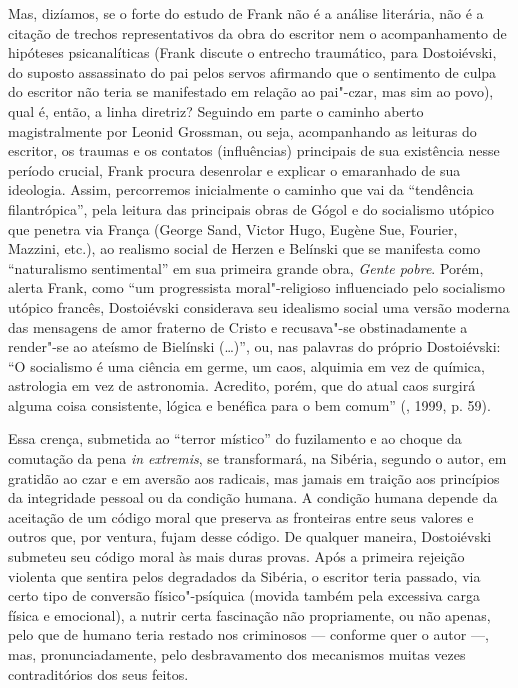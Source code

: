 Mas, dizíamos, se o forte do estudo de Frank não é a análise literária,
não é a citação de trechos representativos da obra do escritor nem o
acompanhamento de hipóteses psicanalíticas (Frank discute o entrecho
traumático, para Dostoiévski, do suposto assassinato do pai pelos servos
afirmando que o sentimento de culpa do escritor não teria se manifestado
em relação ao pai"-czar, mas sim ao povo), qual é, então, a linha
diretriz? Seguindo em parte o caminho aberto magistralmente por Leonid
Grossman, ou seja, acompanhando as leituras do escritor, os traumas e os
contatos (influências) principais de sua existência nesse período
crucial, Frank procura desenrolar e explicar o emaranhado de sua
ideologia. Assim, percorremos inicialmente o caminho que vai da
``tendência filantrópica'', pela leitura das principais obras de Gógol e
do socialismo utópico que penetra via França (George Sand, Victor Hugo,
Eugène Sue, Fourier, Mazzini, etc.), ao realismo social de Herzen e
Belínski que se manifesta como ``naturalismo sentimental'' em sua
primeira grande obra, \emph{Gente pobre}. Porém, alerta Frank, como ``um
progressista moral"-religioso influenciado pelo socialismo utópico
francês, Dostoiévski considerava seu idealismo social uma versão moderna
das mensagens de amor fraterno de Cristo e recusava"-se obstinadamente a
render"-se ao ateísmo de Bielínski (\ldots{})'', ou, nas palavras do
próprio Dostoiévski: ``O socialismo é uma ciência em germe, um caos,
alquimia em vez de química, astrologia em vez de astronomia. Acredito,
porém, que do atual caos surgirá alguma coisa consistente, lógica e
benéfica para o bem comum'' (, 1999, p. 59).

Essa crença, submetida ao ``terror místico'' do fuzilamento e ao choque
da comutação da pena \emph{in extremis}, se transformará, na Sibéria,
segundo o autor, em gratidão ao czar e em aversão aos radicais, mas
jamais em traição aos princípios da integridade pessoal ou da condição
humana. A condição humana depende da aceitação de um código moral que
preserva as fronteiras entre seus valores e outros que, por ventura,
fujam desse código. De qualquer maneira, Dostoiévski submeteu seu código
moral às mais duras provas. Após a primeira rejeição violenta que
sentira pelos degradados da Sibéria, o escritor teria passado, via certo
tipo de conversão físico"-psíquica (movida também pela excessiva carga
física e emocional), a nutrir certa fascinação não propriamente, ou não
apenas, pelo que de humano teria restado nos criminosos --- conforme quer
o autor ---, mas, pronunciadamente, pelo desbravamento dos mecanismos
muitas vezes contraditórios dos seus feitos.


